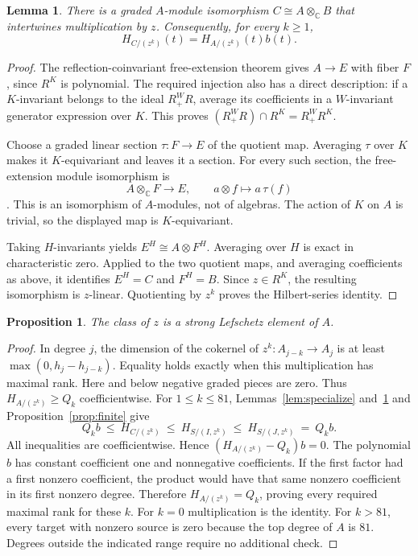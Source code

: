 \documentclass[11pt]{article}
\newtheorem{proposition}[theorem]{Proposition}
\newtheorem{lemma}[theorem]{Lemma}
\theoremstyle{definition}
\newcommand{\C}{\mathbb C}
\begin{document}
\begin{lemma}\label{lem:free}
There is a graded $A$-module isomorphism $C\cong A\otimes_\C B$
that intertwines multiplication by $z$. Consequently, for every
$k\geq1$,
\[
                     H_{C/(z^k)}(t)=H_{A/(z^k)}(t)b(t).
\]
\end{lemma}
\begin{proof}
The reflection-coinvariant free-extension theorem
\cite[Proposition~3.1]{MCCM} gives $A\longrightarrow E$
with fiber $F$, since $R^K$ is polynomial. The required injection
also has a direct description: if a $K$-invariant belongs to the
ideal $R^W_+R$, average its coefficients in a $W$-invariant
generator expression over $K$. This proves
$(R^W_+R)\cap R^K=R^W_+R^K$.

Choose a graded linear section $\tau:F\longrightarrow E$ of the
quotient map. Averaging $\tau$ over $K$ makes it $K$-equivariant and
leaves it a section. For every such section, the free-extension
module isomorphism is
\[
          A\otimes_\C F\longrightarrow E,\qquad
                               a\otimes f\longmapsto a\,\tau(f)
\]
\cite[Lemma~2.21]{MCCM}. This is an isomorphism of $A$-modules, not of
algebras. The action of
$K$ on $A$ is trivial, so the displayed map is $K$-equivariant.

Taking $H$-invariants yields
$E^H\cong A\otimes F^H$. Averaging over $H$ is exact in
characteristic zero. Applied to the two quotient maps, and averaging
coefficients as above, it identifies $E^H=C$ and $F^H=B$.
Since $z\in R^K$, the
resulting isomorphism is $z$-linear. Quotienting by $z^k$ proves
the Hilbert-series identity.
\end{proof}

\begin{proposition}\label{prop:A-SLP}
The class of $z$ is a strong Lefschetz element of $A$.
\end{proposition}
\begin{proof}
In degree $j$, the dimension of the cokernel of
$z^k:A_{j-k}\to A_j$ is at least $\max(0,h_j-h_{j-k})$.
Equality holds exactly when this multiplication has maximal rank.
Here and below negative graded pieces are zero. Thus
$H_{A/(z^k)}\geq Q_k$ coefficientwise.
For $1\leq k\leq81$, Lemmas~\ref{lem:specialize} and~\ref{lem:free}
and Proposition~\ref{prop:finite} give
\[
 Q_k b\ \leq\ H_{C/(z^k)}\ \leq\ H_{S/(I,z^k)}
                    \ \leq\ H_{S/(J,z^k)}\ =\ Q_k b.
\]
All inequalities are coefficientwise. Hence
$(H_{A/(z^k)}-Q_k)b=0$. The polynomial $b$ has constant
coefficient one and nonnegative coefficients. If the first factor
had a first nonzero coefficient, the product would have that same
nonzero coefficient in its first nonzero degree. Therefore
$H_{A/(z^k)}=Q_k$, proving every required maximal rank for these
$k$. For $k=0$ multiplication is the identity. For $k>81$, every
target with nonzero source is zero because the top degree of $A$
is $81$. Degrees outside the indicated range require no additional
check.
\end{proof}
\end{document}
